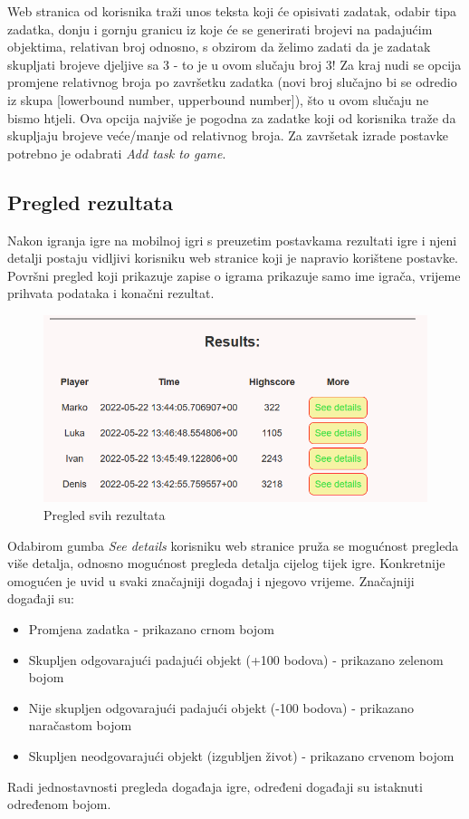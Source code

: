 \documentclass[times, utf8, zavrsni]{fer}
\begin{document}
		Web stranica od korisnika traži unos teksta koji će opisivati zadatak, odabir tipa zadatka, donju i gornju granicu iz koje će se generirati brojevi na padajućim objektima, relativan broj odnosno, s obzirom da želimo zadati da je zadatak
		skupljati brojeve djeljive sa 3 - to je u ovom slučaju broj 3! Za kraj nudi se opcija promjene relativnog broja po završetku zadatka (novi broj slučajno bi se odredio iz skupa [lowerbound number, upperbound number]), što u ovom slučaju ne bismo
		htjeli. Ova opcija najviše je pogodna za zadatke koji od korisnika traže da skupljaju brojeve veće/manje od relativnog broja. Za završetak izrade postavke potrebno je odabrati \textit{Add task to game}.
	
	\subsection{Pregled rezultata}
	Nakon igranja igre na mobilnoj igri s preuzetim postavkama rezultati igre i njeni detalji postaju vidljivi korisniku web stranice koji je napravio korištene postavke. 
	Površni pregled koji prikazuje zapise o igrama prikazuje samo ime igrača, vrijeme prihvata podataka i konačni rezultat.
	\begin{figure}[H]
		\includegraphics[scale = 0.9]{"slike/pregledsvihrezultata.png"} 
		\centering
		\caption{Pregled svih rezultata}
		\label{fig:pregledsvihrezultata}
	\end{figure}
	
	Odabirom gumba \textit{See details} korisniku web stranice pruža se mogućnost pregleda više detalja, odnosno mogućnost pregleda detalja cijelog tijek igre. Konkretnije omogućen je uvid u svaki značajniji događaj i njegovo vrijeme.
	Značajniji događaji su:
		\begin{itemize}
				\item  {Promjena zadatka - prikazano crnom bojom}
				\item  {Skupljen odgovarajući padajući objekt (+100 bodova) - prikazano zelenom bojom}
				\item  {Nije skupljen odgovarajući padajući objekt (-100 bodova) - prikazano naračastom bojom}
				\item  {Skupljen neodgovarajući objekt (izgubljen život) - prikazano crvenom bojom}
		\end{itemize}
	Radi jednostavnosti pregleda događaja igre, određeni događaji su istaknuti određenom bojom.
	
\end{document}
